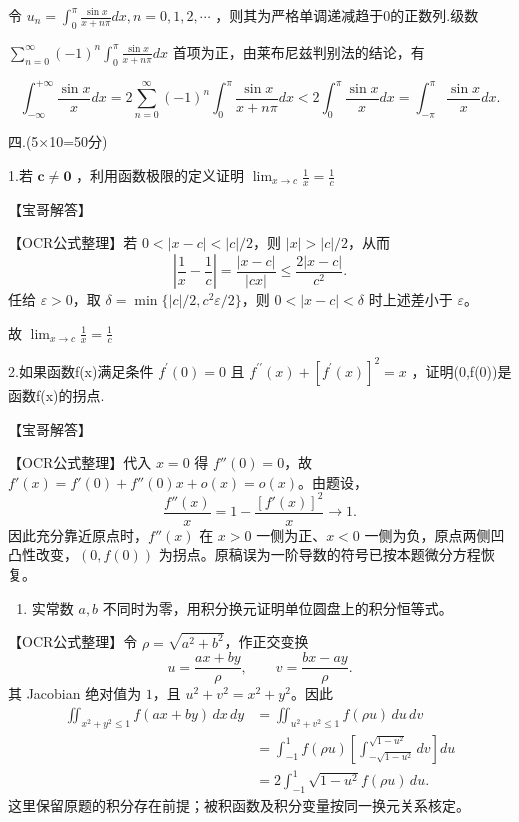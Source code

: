 \documentclass[11pt,fontset=fandol]{ctexart}
\providecommand{\tightlist}{\setlength{\itemsep}{0pt}\setlength{\parskip}{0pt}}
\begin{document}
令
\(u _ { n } = \int _ { 0 } ^ { \pi } \frac { \sin { x } } { x + n \pi } d x , n = 0 , 1 , 2 , \cdots\)
，则其为严格单调递减趋于0的正数列.级数

\(\sum _ { n = 0 } ^ { \infty } ( - 1 ) ^ { n } \int _ { 0 } ^ { \pi } { \frac { \sin x } { x + n \pi } } d x\)
首项为正，由莱布尼兹判别法的结论，有

\[
\int _ { - \infty } ^ { + \infty } \frac { \sin x } { x } d x = 2 \sum _ { n = 0 } ^ { \infty } ( - 1 ) ^ { n } \int _ { 0 } ^ { \pi } \frac { \sin x } { x + n \pi } d x < 2 \int _ { 0 } ^ { \pi } \frac { \sin x } { x } d x = \int _ { - \pi } ^ { \pi } \frac { \sin x } { x } d x .
\]

四.(5×10=50分)

1.若 \(\pmb { c } \neq \pmb { 0 }\) ，利用函数极限的定义证明
\(\lim _ { x \to c } { \frac { 1 } { x } } = { \frac { 1 } { c } }\)

【宝哥解答】

【OCR公式整理】若 \(0<|x-c|<|c|/2\)，则 \(|x|>|c|/2\)，从而 \[
\left|\frac1x-\frac1c\right|
=\frac{|x-c|}{|cx|}\le\frac{2|x-c|}{c^2}.
\] 任给 \(\varepsilon>0\)，取
\(\delta=\min\{|c|/2,c^2\varepsilon/2\}\)，则 \(0<|x-c|<\delta\)
时上述差小于 \(\varepsilon\)。

故 \(\lim _ { x \to c } { \frac { 1 } { x } } = { \frac { 1 } { c } }\)

2.如果函数f(x)满足条件 \(f ^ { \prime } ( 0 ) = 0\) 且
\(f ^ { \prime \prime } ( x ) + \left[ f ^ { \prime } ( x ) \right] ^ { 2 } = x\)
，证明(0,f(0))是函数f(x)的拐点.

【宝哥解答】

【OCR公式整理】代入 \(x=0\) 得 \(f''(0)=0\)，故
\(f'(x)=f'(0)+f''(0)x+o(x)=o(x)\)。由题设， \[
\frac{f''(x)}x=1-\frac{[f'(x)]^2}{x}\longrightarrow1.
\] 因此充分靠近原点时，\(f''(x)\) 在 \(x>0\) 一侧为正、\(x<0\)
一侧为负，原点两侧凹凸性改变，\((0,f(0))\)
为拐点。原稿误为一阶导数的符号已按本题微分方程恢复。

\begin{enumerate}
\def\labelenumi{\arabic{enumi}.}
\setcounter{enumi}{2}
\tightlist
\item
  实常数 \(a,b\) 不同时为零，用积分换元证明单位圆盘上的积分恒等式。
\end{enumerate}

【OCR公式整理】令 \(\rho=\sqrt{a^2+b^2}\)，作正交变换 \[
u=\frac{ax+by}{\rho},\qquad v=\frac{bx-ay}{\rho}.
\] 其 Jacobian 绝对值为 \(1\)，且 \(u^2+v^2=x^2+y^2\)。因此 \[
\begin{aligned}
\iint_{x^2+y^2\le1}f(ax+by)\,dx\,dy
&=\iint_{u^2+v^2\le1}f(\rho u)\,du\,dv\\
&=\int_{-1}^1f(\rho u)\left[\int_{-\sqrt{1-u^2}}^{\sqrt{1-u^2}}dv\right]du\\
&=2\int_{-1}^1\sqrt{1-u^2}f(\rho u)\,du.
\end{aligned}
\] 这里保留原题的积分存在前提；被积函数及积分变量按同一换元关系核定。
\end{document}
